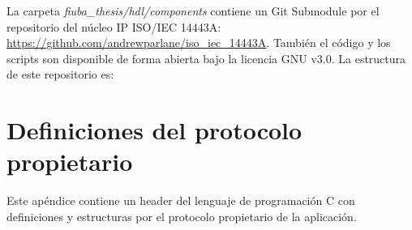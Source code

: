 \documentclass[a4paper, twoside, 11pt]{report}
\begin{document}
La carpeta \textit{fiuba\_thesis/hdl/components} contiene un Git Submodule por el repositorio del núcleo IP ISO/IEC 14443A: \url{https://github.com/andrewparlane/iso_iec_14443A}. También el código y los scripts son disponible de forma abierta bajo la licencia GNU v3.0. La estructura de este repositorio es:

\vspace{1em}


\newpage
\chapter{Definiciones del protocolo propietario}
\label{appendix:protocol_defs}

Este apéndice contiene un header del lenguaje de programación C con definiciones y estructuras por el protocolo propietario de la aplicación.
\end{document}
